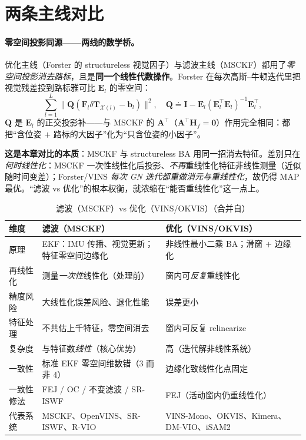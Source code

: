 \section{两条主线对比}
\label{sec:vio-compare}

\paragraph{零空间投影同源——两线的数学桥。}
优化主线（Forster 的 structureless 视觉因子）与滤波主线（MSCKF）都用了\emph{零空间投影消去路标}，且是\textbf{同一个线性代数操作}。Forster 在每次高斯--牛顿迭代里把视觉残差投到路标雅可比 $\mathbf{E}_l$ 的零空间：
\begin{equation}
  \sum_{l=1}^L\|\mathbf{Q}(\mathbf{F}_l\delta\mathbf{T}_{\mathcal{X}(l)}-\mathbf{b}_l)\|^2,
  \quad
  \mathbf{Q}\doteq\mathbf{I}-\mathbf{E}_l(\mathbf{E}_l^\top\mathbf{E}_l)^{-1}\mathbf{E}_l^\top,
  \label{eq:vio-structureless}
\end{equation}
$\mathbf{Q}$ 是 $\mathbf{E}_l$ 的正交投影补——与 MSCKF 的 $\mathbf{A}^\top$（$\mathbf{A}^\top\mathbf{H}_f=\mathbf{0}$）作用完全相同：都把“含位姿 $+$ 路标的大因子”化为“只含位姿的小因子”\cite{forster2017preintegration,mourikis2007msckf}。

\begin{insight}
\textbf{这是本章对比的本质}：MSCKF 与 structureless BA 用同一招消去特征。差别只在\emph{何时线性化}：MSCKF 一次性线性化后投影、\emph{不再}重线性化特征非线性测量（近似随时间变差）；Forster/VINS \emph{每次 GN 迭代都重做消元与重线性化}，故仍得 MAP 最优。“滤波 vs 优化”的根本权衡，就浓缩在“能否重线性化”这一点上。
\end{insight}

\begin{table}[H]\centering\small
\caption{滤波（MSCKF）vs 优化（VINS/OKVIS）（合并自\cite{huang2019vins,mourikis2007msckf,qin2018vins}）}
\label{tab:vio-filter-vs-opt}
\begin{tabular}{lll}
\toprule
维度 & 滤波（MSCKF） & 优化（VINS/OKVIS） \\
\midrule
原理 & EKF：IMU 传播、视觉更新；特征零空间边缘化 & 非线性最小二乘 BA；滑窗 $+$ 边缘化 \\
再线性化 & 测量\emph{一次性}线性化（处理前） & 窗内可\emph{反复}重线性化 \\
精度风险 & 大线性化误差风险、退化性能 & 误差更小 \\
特征处理 & 不共估上千特征，零空间消去 & 窗内可反复 relinearize \\
复杂度 & 与特征数\emph{线性}（核心优势） & 高（迭代解非线性系统） \\
一致性 & 标准 EKF 零空间维数错（$3$ 而非 $4$）& 边缘化致线性化点固定 \\
一致性修法 & FEJ / OC / 不变滤波 / SR-ISWF & FEJ（活动窗内仍重线性化） \\
代表系统 & MSCKF、OpenVINS、SR-ISWF、R-VIO & VINS-Mono、OKVIS、Kimera、DM-VIO、iSAM2 \\
\bottomrule
\end{tabular}
\end{table}

